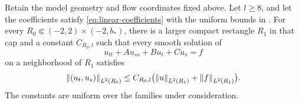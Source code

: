 \begin{lemma}\label{lem:gradient}
Retain the model geometry and flow coordinates fixed above.
Let \(l\ge8\), and let the coefficients satisfy
\eqref{eq:linear-coefficients} with the uniform bounds in
. For every
\(R_0\Subset(-2,2)\times(-2,b_*)\), there is a larger compact
rectangle \(R_1\) in that cap and a constant \(C_{R_0,l}\) such that
every smooth solution of
\[
u_{tt}+Au_{ss}+Bu_t+Cu_s=f
\]
on a neighborhood of \(R_1\) satisfies
\begin{equation}\label{eq:gradient-bound}
\left\lVert(u_t,u_s)\right\rVert_{L^2(R_0)}
\le C_{R_0,l}\bigl(\left\lVert u\right\rVert_{L^2(R_1)}+\left\lVert f\right\rVert_{L^2(R_1)}\bigr).
\end{equation}
The constants are uniform over the families under consideration.
\end{lemma}


